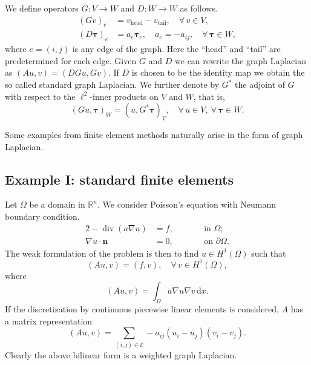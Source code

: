 \documentclass[ ]{elsarticle}
\newcommand{\cE}{\mathcal{E}}
\newcommand{\Reals}{\mathbb{R}}
\newcommand{\mforall}{\forall\,}
\newcommand{\dvg}{\operatorname{div}}
\newcommand{\Grad}{G}
\newcommand{\Div}{G^*}
\newcommand{\vsp}{V}
\newcommand{\esp}{W}
\newcommand{\dif}{\,\mathrm d}
\numberwithin{equation}{section}
\begin{document}
We define operators $\Grad\colon\vsp\to\esp$ and $D\colon\esp\to\esp$
as follows.
\begin{align*}
  (\Grad v)_e & = v_{\text{head}}-v_{\text{tail}}, \quad \mforall v\in\vsp, \\
  (D\bm\tau)_e & = a_e\bm\tau_e, \quad a_e = -a_{ij}, \quad \mforall\bm\tau\in\esp,
\end{align*}
where $e=(i,j)$ is any edge of the graph. Here the ``head'' and
``tail'' are predetermined for each edge. Given $\Grad$ and $D$ we can
rewrite the graph Laplacian as $(Au,v)=(D\Grad u,\Grad v)$. If $D$ is
chosen to be the identity map we obtain the so called standard graph
Laplacian. We further denote by $\Div$ the adjoint of $\Grad$ with
respect to the $\ell^2$-inner products on $\vsp$ and $\esp$, that is,
\begin{equation*}
  (\Grad u,\bm\tau)_{\esp}=(u,\Div\bm\tau)_{\vsp},
  \quad \mforall u\in\vsp,\ \mforall\bm\tau\in\esp.
\end{equation*}

Some examples from finite element methods naturally arise in the form
of graph Laplacian.

\subsection{Example I: standard finite elements}
Let $\Omega$ be a domain in $\Reals^n$. We consider Poisson's equation
with Neumann boundary condition.
\begin{alignat*}{2}
  -\dvg(a\nabla u)     & = f, \qquad && \text{in }\Omega;\\
  \nabla u\cdot\mathbf n & = 0, \qquad && \text{on }\partial\Omega.  
\end{alignat*} 
The weak formulation of the problem is then to find $u\in H^1(\Omega)$
such that
\begin{equation*}
  (Au,v)=(f,v),\quad\mforall v\in H^1(\Omega),
\end{equation*}
where
\begin{equation*}
(Au,v)=\int_\Omega a\nabla u\nabla v\dif x.
\end{equation*}
If the discretization by continuous piecewise linear elements is
considered, $A$ has a matrix representation
\begin{equation*}
(Au,v)=\sum_{(i,j)\in \cE}-a_{ij}(u_i-u_j)(v_i-v_j).
\end{equation*}
Clearly the above bilinear form is a weighted graph Laplacian.
\end{document}

